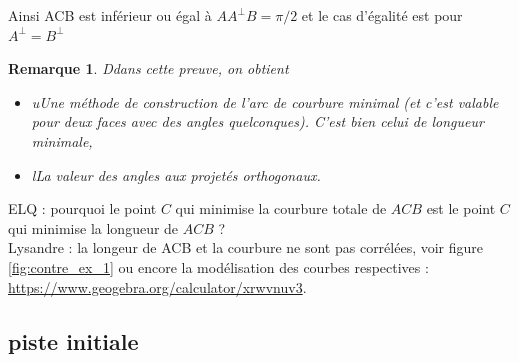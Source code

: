 \documentclass{article}
\newtheorem{rem}{Remarque}
\begin{document}
Ainsi ACB est inférieur ou égal à $AA^\perp B=\pi/2$ et le cas d’égalité est pour $A^\perp =B^\perp $

\begin{rem}
Ddans cette preuve, on obtient 
\begin{itemize}
    \item uUne méthode de construction de l’arc de courbure minimal (et c’est valable pour deux faces avec des angles quelconques). C'est bien celui de longueur minimale,
    \item lLa valeur des angles aux projetés orthogonaux. 
\end{itemize}
\end{rem}
ELQ : pourquoi le point $C$ qui minimise la courbure totale de $ACB$ est le point $C$ qui minimise la longueur de $ACB$ ? \\
Lysandre : la longeur de ACB et la courbure ne sont pas corrélées, voir figure \ref{fig:contre_ex_1} ou encore la modélisation des courbes respectives : \url{https://www.geogebra.org/calculator/xrwvnuv3}.


\subsection{piste initiale}
\end{document}
